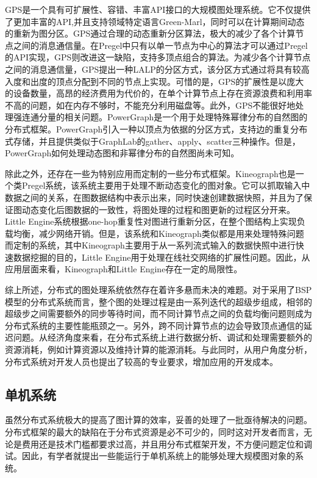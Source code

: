 GPS\cite{salihoglu2013gps}是一个具有可扩展性、容错、丰富API接口的大规模图处理系统。它不仅提供了更加丰富的API,并且支持领域特定语言Green-Marl\cite{hong2012green,hong2012tech}，同时可以在计算期间动态的重新为图分区。GPS通过合理的动态重新分区算法，极大的减少了各个计算节点之间的消息通信量。在Pregel中只有以单一节点为中心的算法才可以通过Pregel的API实现，GPS则改进这一缺陷，支持多顶点组合的算法。为减少各个计算节点之间的消息通信量，GPS提出一种LALP的分区方式，该分区方式通过将具有较高入度和出度的顶点分配到不同的节点上实现。可惜的是，GPS的扩展性是以庞大的设备数量，高昂的经济费用为代价的，在单个计算节点上存在资源浪费和利用率不高的问题，如在内存不够时，不能充分利用磁盘等。此外，GPS不能很好地处理强连通分量的相关问题。PowerGraph\cite{gonzalez2012powergraph}是一个用于处理特殊幂律分布的自然图的分布式框架。PowerGraph引入一种以顶点为依据的分区方式，支持边的重复分布式存储，并且提供类似于GraphLab的gather、apply、scatter三种操作。但是，PowerGraph如何处理动态图和非幂律分布的自然图尚未可知。

除此之外，还存在一些为特别应用而定制的一些分布式框架。Kineograph\cite{cheng2012kineograph}也是一个类Pregel系统，该系统主要用于处理不断动态变化的图对象。它可以抓取输入中数据之间的关系，在图数据结构中表示出来，同时快速创建数据快照，并且为了保证图动态变化后图数据的一致性，将图处理的过程和图更新的过程区分开来。Little Engine\cite{pujol2011little}系统根据one-hop重复性对图进行重新分区，在整个图结构上实现负载均衡，减少网络开销。但是，该系统和Kineograph类似都是用来处理特殊问题而定制的系统，其中Kineograph主要用于从一系列流式输入的数据快照中进行快速数据挖掘的目的，Little Engine用于处理在线社交网络的扩展性问题。因此，从应用层面来看，Kineograph和Little Engine存在一定的局限性。

综上所述，分布式的图处理系统依然存在着许多悬而未决的难题。对于采用了BSP模型的分布式系统而言，整个图的处理过程是由一系列迭代的超级步组成，相邻的超级步之间需要额外的同步等待时间，而不同计算节点之间的负载均衡问题则成为分布式系统的主要性能瓶颈之一。另外，跨不同计算节点的边会导致顶点通信的延迟问题。从经济角度来看，在分布式系统上进行数据分析、调试和处理需要额外的资源消耗，例如计算资源以及维持计算的能源消耗。与此同时，从用户角度分析，分布式系统对开发人员也提出了较高的专业要求，增加应用的开发成本。

\subsection{单机系统}

虽然分布式系统极大的提高了图计算的效率，妥善的处理了一批亟待解决的问题。分布式框架的最大的缺陷在于分布式资源是必不可少的，同时这对开发者而言，无论是费用还是技术门槛都要求过高，并且用分布式框架开发，不方便问题定位和调试。因此，有学者就提出一些能运行于单机系统上的能够处理大规模图对象的系统。

